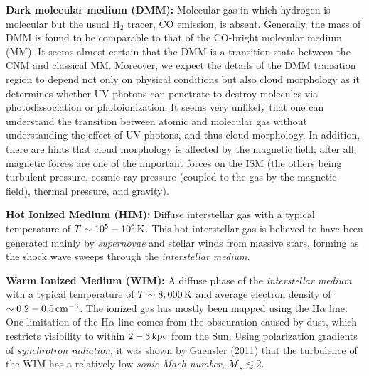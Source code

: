 \documentclass[a4paper,10pt]{article}
\begin{document}
{\noindent}\textbf{Dark molecular medium (DMM):} Molecular gas in which hydrogen is molecular but the usual H$_2$ tracer, CO emission, is absent. Generally, the mass of DMM is found to be comparable to that of the CO-bright molecular medium (MM). It seems almost certain that the DMM is a transition state between the CNM and classical MM. Moreover, we expect the details of the DMM transition region to depend not only on physical conditions but also cloud morphology as it determines whether UV photons can penetrate to destroy molecules via photodissociation or photoionization. It seems very unlikely that one can understand the transition between atomic and molecular gas without understanding the effect of UV photons, and thus cloud morphology. In addition, there are hints that cloud morphology is affected by the magnetic field; after all, magnetic forces are one of the important forces on the ISM (the others being turbulent pressure, cosmic ray pressure (coupled to the gas by the magnetic field), thermal pressure, and gravity).

{\noindent}\textbf{Hot Ionized Medium (HIM):} Diffuse interstellar gas with a typical temperature of $T\sim10^5-10^6\,{\rm K}$. This hot interstellar gas is believed to have been generated mainly by \textit{supernovae} and stellar winds from massive stars, forming as the shock wave sweeps through the \textit{interstellar medium}.

{\noindent}\textbf{Warm Ionized Medium (WIM):} A diffuse phase of the \textit{interstellar medium} with a typical temperature of $T\sim8,000\,{\rm K}$ and average electron density of $\sim0.2-0.5\,{\rm cm^{-3}}$.  The ionized gas has mostly been mapped using the H$\alpha$ line. One limitation of the H$\alpha$ line comes from the obscuration caused by dust, which restricts visibility to within $2-3\,{\rm kpc}$ from the Sun. Using polarization gradients of \textit{synchrotron radiation}, it was shown by Gaensler (2011) that the turbulence of the WIM has a relatively low \textit{sonic Mach number}, $\mathcal{M}_s\lesssim2$.
\end{document}
